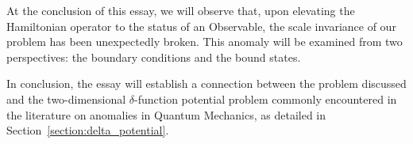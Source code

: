 At the conclusion of this essay, we will observe that, upon elevating the Hamiltonian operator to the status of an Observable, the scale invariance of our problem has been unexpectedly broken. This anomaly will be examined from two perspectives: the boundary conditions and the bound states.

In conclusion, the essay will establish a connection between the problem discussed and the two-dimensional $\delta$-function potential problem commonly encountered in the literature on anomalies in Quantum Mechanics, as detailed in Section~\ref{section:delta_potential}.
